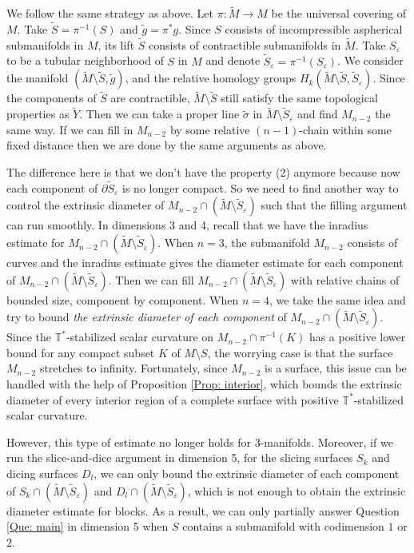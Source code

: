 \documentclass[11pt, reqno]{amsart}
\numberwithin{equation}{section}
\theoremstyle{definition}
\newcommand{\ve}{\varepsilon}
\newcommand{\ti}[1]{\tilde{#1}}
\begin{document}
We follow the same strategy as above.
Let $\pi:\tilde M\to M$ be the universal covering of $M$. Take $\tilde S=\pi^{-1}(S)$ and $\tilde g=\pi^*g$.  Since $S$ consists of incompressible aspherical submanifolds in $M$, its lift $\tilde S$ consists of contractible submanifolds in $\tilde M$. Take $S_\ve$ to be a tubular neighborhood of $S$ in $M$ and denote $\tilde S_\ve=\pi^{-1}(S_\ve)$. We consider the manifold $(\tilde M \setminus \tilde S, \ti g)$, and the relative homology groups $H_k(\tilde M \setminus \tilde S, \ti S_\ve)$.
Since the components of $\tilde S$ are contractible, $\tilde M \setminus \tilde S$ still satisfy the same topological properties as $\tilde Y$.
Then we can take a proper line $\tilde \sigma$ in $\tilde M\setminus \tilde S_\ve$ and find $M_{n-2}$ the same way. If we can fill in $M_{n-2}$ by some relative $(n-1)$-chain within some fixed distance then we are done by the same arguments as above.

The difference here is that we don't have the property (2) anymore because now each component of $\partial \ti S_\ve$ is no longer compact. So we need to find another way to control the extrinsic diameter of $M_{n-2} \cap (\tilde M\setminus \tilde S_\ve)$ such that the filling argument can run smoothly.
In dimensions 3 and 4, recall that we have the inradius estimate for $M_{n-2}\cap (\tilde M\setminus\tilde S_{\ve})$. When $n=3$, the submanifold $M_{n-2}$ consists of curves and the inradius estimate gives the diameter estimate for each component of $M_{n-2}\cap (\tilde M\setminus \tilde S_{\ve})$. Then we can fill $M_{n-2}\cap (\tilde M\setminus \tilde S_{\ve})$ with relative chains of bounded size, component by component. When $n=4$, we take the same idea and try to bound \emph{the extrinsic diameter of each component} of $M_{n-2} \cap (\tilde M\setminus \tilde S_\ve)$. Since the $\mathbb{T}^{*}$-stabilized scalar curvature on $M_{n-2} \cap \pi^{-1}(K)$ has a positive lower bound for any compact subset $K$ of $M\setminus S$, the worrying case is that the surface $M_{n-2}$ stretches to infinity. Fortunately, since $M_{n-2}$ is a surface, this issue can be handled with the help of Proposition \ref{Prop: interior}, which bounds the extrinsic diameter of every interior region of a complete surface with positive $\mathbb{T}^{*}$-stabilized scalar curvature.




However, this type of estimate no longer holds for 3-manifolds. Moreover, if we run the slice-and-dice argument in dimension 5, for the slicing surfaces $S_{k}$ and dicing surfaces $D_l$, we can only bound the extrinsic diameter of each component of $S_{k} \cap (\tilde M\setminus \tilde S_\ve)$ and $D_{l} \cap (\tilde M\setminus \tilde S_\ve)$,
which is not enough to obtain the extrinsic diameter estimate for blocks.
As a result, we can only partially answer Question \ref{Que: main} in dimension 5 when $S$ contains a submanifold with codimension $1$ or $2$.
\end{document}

